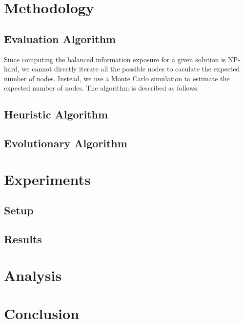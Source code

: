 \documentclass{article}
\begin{document}
\section{Methodology}

\subsection{Evaluation Algorithm}
Since computing the balanced information exposure for a given solution is NP-hard, we cannot directly iterate all the possible nodes to caculate the expected number of nodes. Instead, we use a Monte Carlo simulation to estimate the expected number of nodes. The algorithm is described as follows:

\subsection{Heuristic Algorithm}

\subsection{Evolutionary Algorithm}

\section{Experiments}

\subsection{Setup}

\subsection{Results}

\section{Analysis}

\section{Conclusion}
\end{document}
